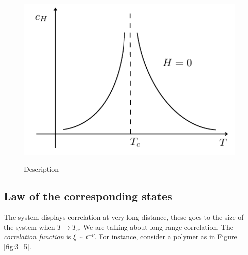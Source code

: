 \documentclass[../main/main.tex]{subfiles}
\begin{document}
\begin{figure}[h!]
\begin{minipage}[c]{0.5\linewidth}
{\includegraphics[width=1\textwidth]{../lessons/3_image/12.pdf}
    \label{fig:3_4_3} }
\end{minipage}
\begin{minipage}[]{0.5\linewidth}
\centering
{}
\end{minipage}
\caption{\label{fig:} Description}
\end{figure}


\subsection{Law of the corresponding states}
The system displays correlation at very long distance, these goes to the size of the system when \( T \rightarrow T_c \). We are talking about long range correlation. The \emph{correlation function} is \( \xi \sim t^{-\nu } \).
For instance, consider a polymer as in Figure \ref{fig:3_5}.
\end{document}
